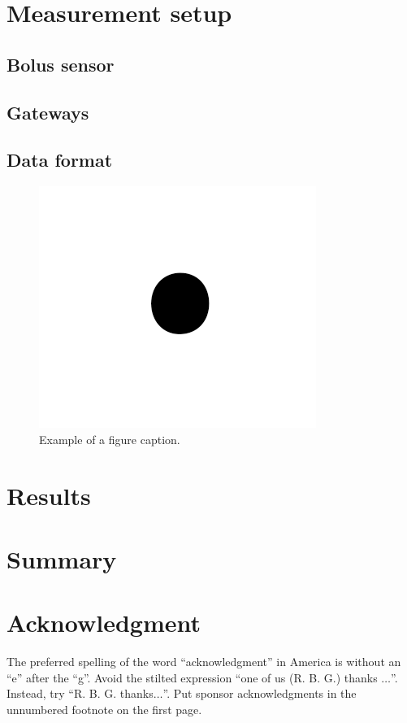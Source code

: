 \documentclass[conference]{IEEEtran}
\begin{document}


\section{Measurement setup}

\subsection{Bolus sensor}

\subsection{Gateways}

\subsection{Data format}

\begin{figure}[htbp]
\centerline{\includegraphics{fig/fig1.png}}
\caption{Example of a figure caption.}
\label{fig}
\end{figure}

\section{Results}

\cite{nagl2003}

\section{Summary}

\section*{Acknowledgment}

The preferred spelling of the word ``acknowledgment'' in America is without 
an ``e'' after the ``g''. Avoid the stilted expression ``one of us (R. B. 
G.) thanks $\ldots$''. Instead, try ``R. B. G. thanks$\ldots$''. Put sponsor 
acknowledgments in the unnumbered footnote on the first page.



\end{document}
